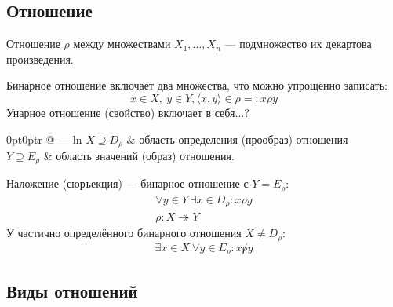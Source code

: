 \subsection{Отношение}

{\bold Отношение} $\rho$ между множествами $X_1,\dots,X_n$ --- подмножество их {\ital декартова произведения}.

\begin{theorem}
{\bold Бинарное} отношение включает {\ital два} множества, что можно упрощённо записать:
$$x\in X,\ y\in Y, \langle x, y\rangle\in\rho=:x\rho y$$
{\bold Унарное} отношение {\ital\color{desc} (свойство)} включает в себя...?
\end{theorem}

\begin{tabularc}{0pt}{0pt}{r @{ --- } l}{n}
$X\supseteq D_\rho$ & область определения {\bold (прообраз)} отношения\\
$Y\supseteq E_\rho$ & область значений {\bold (образ)} отношения.
\end{tabularc}
{\bold Наложение} {\ital (сюръекция)} --- бинарное отношение с $Y=E_\rho$:
$$\begin{gathered}
\forall y\in Y\ \exists x\in D_\rho\colon x\rho y\\
\rho\colon X\twoheadrightarrow Y
\end{gathered}$$
У {\bold частично определённого} бинарного отношения $X\neq D_\rho$:
$$\exists x\in X\ \forall y\in E_\rho\colon x\not\rho y$$

\subsection{Виды отношений}

